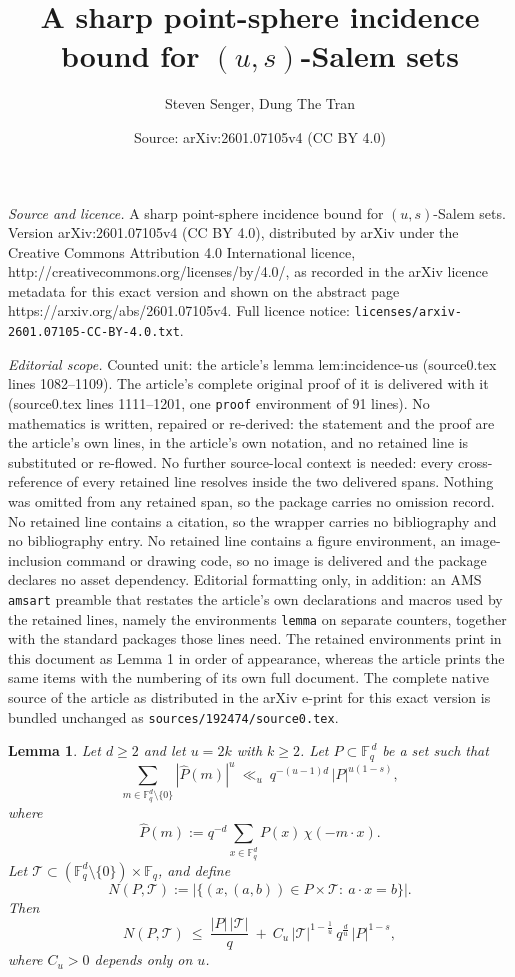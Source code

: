 \documentclass[10pt,a4paper]{amsart}
\title{A sharp point-sphere incidence bound for $(u, s)$-Salem sets}
\author{Steven Senger, Dung The Tran}
\date{Source: arXiv:2601.07105v4 (CC BY 4.0)}
\newtheorem{lemma}{Lemma}
\begin{document}
\maketitle

\noindent\emph{Source and licence.} A sharp point-sphere incidence bound for $(u, s)$-Salem sets. Version arXiv:2601.07105v4 (CC BY 4.0), distributed by arXiv under the Creative Commons Attribution 4.0 International licence, http://creativecommons.org/licenses/by/4.0/, as recorded in the arXiv licence metadata for this exact version and shown on the abstract page https://arxiv.org/abs/2601.07105v4. Full licence notice: \texttt{licenses/arxiv-2601.07105-CC-BY-4.0.txt}.\par\smallskip

\noindent\textit{Editorial scope.} Counted unit: the article's lemma lem:incidence-us (source0.tex lines 1082--1109). The article's complete original proof of it is delivered with it (source0.tex lines 1111--1201, one \texttt{proof} environment of 91 lines). No mathematics is written, repaired or re-derived: the statement and the proof are the article's own lines, in the article's own notation, and no retained line is substituted or re-flowed.  No further source-local context is needed: every cross-reference of every retained line resolves inside the two delivered spans.  Nothing was omitted from any retained span, so the package carries no omission record.  No retained line contains a citation, so the wrapper carries no bibliography and no bibliography entry.  No retained line contains a figure environment, an image-inclusion command or drawing code, so no image is delivered and the package declares no asset dependency.  Editorial formatting only, in addition: an AMS \texttt{amsart} preamble that restates the article's own declarations and macros used by the retained lines, namely the environments \texttt{lemma} on separate counters, together with the standard packages those lines need.  The retained environments print in this document as Lemma 1 in order of appearance, whereas the article prints the same items with the numbering of its own full document.  The complete native source of the article as distributed in the arXiv e-print for this exact version is bundled unchanged as \texttt{sources/192474/source0.tex}.
\begin{lemma}\label{lem:incidence-us}
Let $d\ge 2$ and let $u=2k$ with $k\ge 2$.
Let $P\subset \mathbb{F}_q^{\,d}$ be a set such that
\begin{equation}\label{eq:us-salem-fourier}
\sum_{m\in\mathbb{F}_q^d\setminus\{0\}} |\widehat{P}(m)|^{u}
\ \ll_u\
q^{-(u-1)d}\,|P|^{u(1-s)},
\end{equation}
where
\[
\widehat{P}(m):=q^{-d}\sum_{x\in\mathbb{F}_q^d} P(x)\,\chi(-m\cdot x).
\]
Let $\mathcal{T}\subset (\mathbb{F}_q^d\setminus\{0\})\times \mathbb{F}_q$, and define
\[
N(P,\mathcal{T})
:=
\bigl|\{(x,(a,b))\in P\times \mathcal{T}:\ a\cdot x=b\}\bigr|.
\]
Then
\[
N(P,\mathcal{T})
\ \le\
\frac{|P|\,|\mathcal{T}|}{q}
\ +\
C_u\,|\mathcal{T}|^{1-\frac{1}{u}}\,q^{\frac{d}{u}}\,|P|^{1-s},
\]
where $C_u>0$ depends only on $u$.
\end{lemma}
\end{document}
